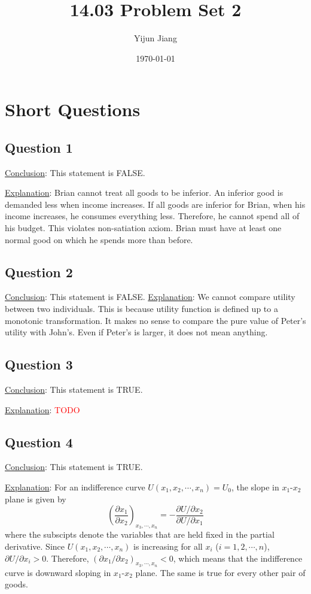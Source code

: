 \documentclass{article}
\title{14.03 Problem Set 2}
\author{Yijun Jiang}
\date{\today}
\begin{document}
\maketitle

\section{Short Questions}
\subsection{Question 1}
\noindent\underline{Conclusion}: This statement is FALSE.

\noindent\underline{Explanation}: Brian cannot treat all goods to be inferior. An inferior good is demanded less when income increases. If all goods are inferior for Brian, when his income increases, he consumes everything less. Therefore, he cannot spend all of his budget. This violates non-satiation axiom. Brian must have at least one normal good on which he spends more than before.

\subsection{Question 2}
\noindent\underline{Conclusion}: This statement is FALSE.
\noindent\underline{Explanation}: We cannot compare utility between two individuals. This is because utility function is defined up to a monotonic transformation. It makes no sense to compare the pure value of Peter's utility with John's. Even if Peter's is larger, it does not mean anything.

\subsection{Question 3}
\noindent\underline{Conclusion}: This statement is TRUE.

\noindent\underline{Explanation}: \textcolor{red}{TODO}

\subsection{Question 4}
\noindent\underline{Conclusion}: This statement is TRUE.

\noindent\underline{Explanation}: For an indifference curve $U(x_1,x_2,\cdots,x_n)=U_0$, the slope in $x_1$-$x_2$ plane is given by
\begin{equation*}
	\left(\frac{\partial x_1}{\partial x_2}\right)_{x_3,\cdots,x_n}=-\frac{\partial U/\partial x_2}{\partial U/\partial x_1}
\end{equation*}
where the subscipts denote the variables that are held fixed in the partial derivative. Since $U(x_1,x_2,\cdots,x_n)$ is increasing for all $x_i$ ($i=1,2,\cdots,n$), $\partial U/\partial x_i>0$. Therefore, $(\partial x_1/\partial x_2)_{x_3,\cdots,x_n}<0$, which means that the indifference curve is downward sloping in $x_1$-$x_2$ plane. The same is true for every other pair of goods.
\end{document}
